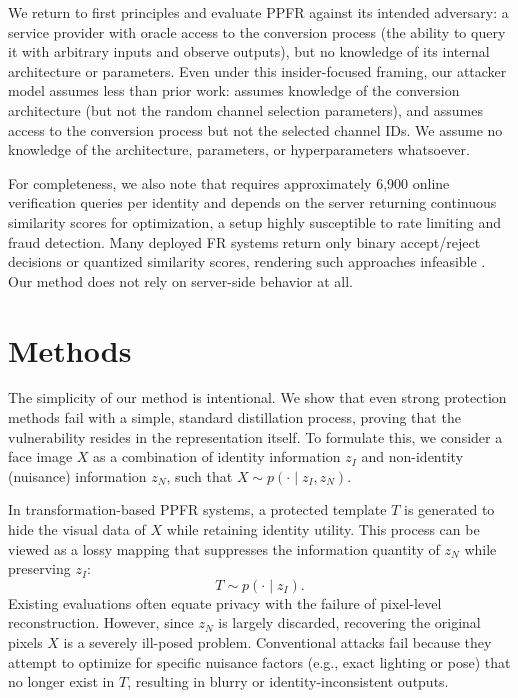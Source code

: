 We return to first principles and evaluate PPFR against its intended adversary: a service provider with oracle access to the conversion process (the ability to query it with arbitrary inputs and observe outputs), but no knowledge of its internal architecture or parameters. Even under this insider-focused framing, our attacker model assumes less than prior work: \citet{mi_privacy-preserving_2024} assumes knowledge of the conversion architecture (but not the random channel selection parameters), and \citet{mi_privacy-preserving_2023} assumes access to the conversion process but not the selected channel IDs. We assume no knowledge of the architecture, parameters, or hyperparameters whatsoever.

For completeness, we also note that \citet{zhang_validating_2024} requires approximately 6{,}900 online verification queries per identity and depends on the server returning continuous similarity scores for optimization, a setup highly susceptible to rate limiting and fraud detection. Many deployed FR systems return only binary accept/reject decisions or quantized similarity scores, rendering such approaches infeasible \citep{noauthor_characterizing_2011, noauthor_bioapi_2001}. Our method does not rely on server-side behavior at all.











\section{Methods}
The simplicity of our method is intentional. We show that even strong protection methods fail with a simple, standard distillation process, proving that the vulnerability resides in the representation itself. To formulate this, we consider a face image $X$ as a combination of identity information $z_I$ and non-identity (nuisance) information $z_N$, such that $X \sim p(\cdot \mid z_I, z_N)$.

In transformation-based PPFR systems, a protected template $T$ is generated to hide the visual data of $X$ while retaining identity utility. This process can be viewed as a lossy mapping that suppresses the information quantity of $z_N$ while preserving $z_I$:
\begin{equation}
T \sim p(\cdot \mid z_I).
\end{equation}
Existing evaluations often equate privacy with the failure of pixel-level reconstruction. However, since $z_N$ is largely discarded, recovering the original pixels $X$ is a severely ill-posed problem. Conventional attacks fail because they attempt to optimize for specific nuisance factors (e.g., exact lighting or pose) that no longer exist in $T$, resulting in blurry or identity-inconsistent outputs.

